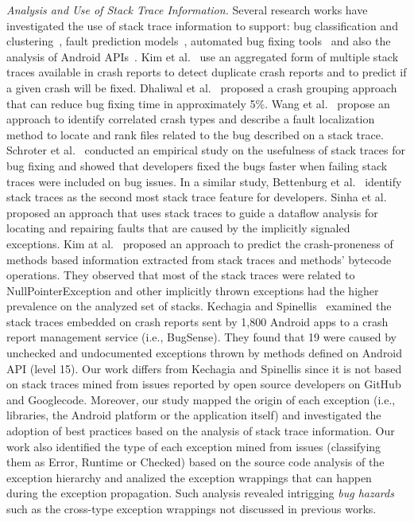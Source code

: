 \documentclass[conference]{IEEEtran}
\begin{document}
\textit{Analysis and Use of Stack Trace Information.} Several research works have
investigated the use of stack trace information to support: bug classification
and clustering~\cite{wang2013improving, kim2011crash, dhaliwal2011classifying},
fault prediction models~\cite{kim2013predicting}, automated
bug fixing tools~\cite{sinha2009fault} and also the analysis of Android APIs~\cite{kechagia2014}. 
Kim et al.~\cite{kim2011crash} use an
aggregated form of multiple stack traces available in crash reports to detect
duplicate crash reports and to predict if a given crash will be fixed. Dhaliwal
et al.~\cite{dhaliwal2011classifying} proposed a crash grouping approach that
can reduce bug fixing time in approximately 5\%. Wang et
al.~\cite{wang2013improving} propose an approach to identify correlated crash
types and describe a fault localization method to locate and rank files related
to the bug described on a stack trace. Schroter et al.~\cite{schroter2010stack}
conducted an empirical study on the usefulness of stack traces for bug fixing
and showed that developers fixed the bugs faster when failing stack traces were
included on bug issues.  In a similar study, Bettenburg et
al.~\cite{bettenburg2008makes} identify stack traces as the second most stack
trace feature for developers.  Sinha et al.~\cite{sinha2009fault} proposed an
approach that uses stack traces to guide a dataflow analysis for locating and
repairing faults that are caused by the implicitly signaled exceptions. Kim
at al.~\cite{kim2013predicting} proposed an approach to predict the
crash-proneness of methods based information extracted from stack traces and
methods' bytecode operations.  They observed that most of the stack traces were
related to NullPointerException and other implicitly thrown exceptions had
the higher prevalence on the analyzed set of stacks. Kechagia and Spinellis~\cite{kechagia2014}
examined the stack traces embedded on crash reports sent by 1,800 Android apps 
to a crash report management service (i.e., BugSense). They found that 19%
were caused by unchecked and undocumented exceptions thrown by methods defined on 
Android API (level 15). Our work differs from Kechagia and Spinellis since it is not based on
stack traces mined from issues reported by open source developers on GitHub and Googlecode.  
Moreover, our study mapped the origin of each exception 
(i.e., libraries, the Android platform or the application itself) and investigated
the adoption of best practices based on the analysis of stack trace information.
Our work also identified the type of each exception mined from issues
(classifying them as Error, Runtime or Checked) based on the source code
analysis of the exception hierarchy and analized the exception wrappings that can 
happen during the exception propagation.  Such analysis revealed intrigging 
\emph{bug hazards} such as the cross-type exception wrappings not discussed in previous works.
\end{document}
